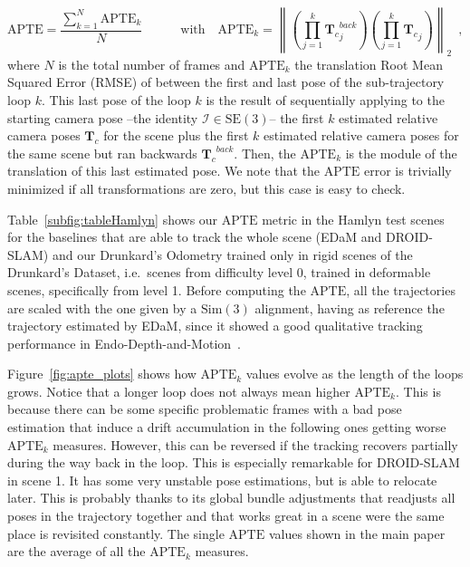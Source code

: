 \documentclass{article}
\begin{document}
\begin{equation}
   \mathrm{APTE} =  \frac{\sum_{k=1}^{N} \mathrm{APTE}_k}{N} 
   \qquad \quad \text{with} \quad
   \mathrm{APTE}_k = \left\lVert \left( \prod_{j=1}^{k} {\mathbf{T}_c}_j^{back} \right) \left(\prod_{j=1}^{k} {\mathbf{T}_c}_j\right) \right\rVert_2 \enspace,
   \label{eq:APTE}
\end{equation}
where $N$ is the total number of frames and $\mathrm{APTE}_k$ the translation Root Mean Squared Error (RMSE) of between the first and last pose of the sub-trajectory loop $k$. This last pose of the loop $k$ is the result of sequentially applying to the starting camera pose --the identity $\mathcal{I} \in \ensuremath{\mathrm{SE}(3)}$-- the first $k$ estimated relative camera poses ${\mathbf{T}_c}$ for the scene plus the first $k$ estimated relative camera poses for the same scene but ran backwards ${\mathbf{T}_c}^{back}$.
Then, the $\mathrm{APTE}_k$ is the module of the translation of this last estimated pose.
We note that the $\mathrm{APTE}$ error is trivially minimized if all transformations are zero, but this case is easy to check.

Table~\ref{subfig:tableHamlyn} shows our $\mathrm{APTE}$ metric in the Hamlyn test scenes for the baselines that are able to track the whole scene (EDaM and DROID-SLAM) and our Drunkard's Odometry trained only in rigid scenes of the Drunkard's Dataset, i.e.\ scenes from difficulty level 0, trained in deformable scenes, specifically from level 1. Before computing the $\mathrm{APTE}$, all the trajectories are scaled with the one given by a $\mathrm{Sim}(3)$ alignment, having as reference the trajectory estimated by EDaM, since it showed a good qualitative tracking performance in Endo-Depth-and-Motion~\cite{recasens2021endo}. 

Figure~\ref{fig:apte_plots} shows how $\mathrm{APTE}_k$ values evolve as the length of the loops grows. Notice that a longer loop does not always mean higher $\mathrm{APTE}_k$. This is because there can be some specific problematic frames with a bad pose estimation that induce a drift accumulation in the following ones getting worse $\mathrm{APTE}_k$ measures. However, this can be reversed if the tracking recovers partially during the way back in the loop. This is especially remarkable for DROID-SLAM in scene 1. It has some very unstable pose estimations, but is able to relocate later. This is probably thanks to its global bundle adjustments that readjusts all poses in the trajectory together and that works great in a scene were the same place is revisited constantly. The single $\mathrm{APTE}$ values shown in the main paper are the average of all the $\mathrm{APTE}_k$ measures.
\end{document}
